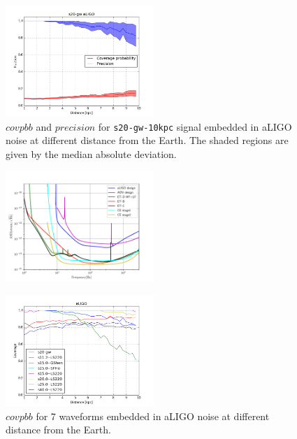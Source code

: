 \begin{figure}
  \centering
  \includegraphics[width=0.5\textwidth]{plots/s20-gw_covpbb_prec_aLIGO}
 \caption{$covpbb$ and $precision$ for {\tt s20-gw-10kpc} signal embedded in aLIGO noise at different distance from the Earth. The shaded regions are given by the median absolute deviation.} \label{fig:s20results}
\end{figure}


\begin{figure}
 \centering
 \includegraphics[width=0.5\textwidth]{plots/spectrum}
 \caption{} \label{fig:spectrum}
\end{figure}

\begin{figure}
  \centering
  \includegraphics[width=0.5\textwidth]{plots/covppb_all_aLIGO}
 \caption{$covpbb$ for 7 waveforms embedded in aLIGO noise at different distance from the Earth. } \label{fig:aLIGOall}
\end{figure}

